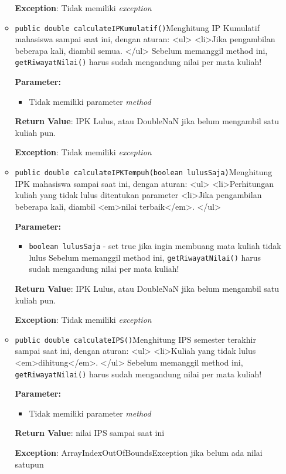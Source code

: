 \documentclass{article}
\begin{document}
\begin{enumerate}
\begin{itemize}
\textbf{Exception}: Tidak memiliki \textit{exception}

\item \texttt{public double calculateIPKumulatif()}Menghitung IP Kumulatif mahasiswa sampai saat ini, dengan aturan:
 <ul>
   <li>Jika pengambilan beberapa kali, diambil semua.
 </ul>
 Sebelum memanggil method ini, \texttt{getRiwayatNilai()} harus sudah mengandung nilai per mata kuliah!

\textbf{Parameter:}
\begin{itemize}
\item Tidak memiliki parameter \textit{method}
\end{itemize}
\textbf{Return Value}: IPK Lulus, atau  DoubleNaN jika belum mengambil satu kuliah pun.

\textbf{Exception}: Tidak memiliki \textit{exception}

\item \texttt{public double calculateIPKTempuh(boolean lulusSaja)}Menghitung IPK mahasiswa sampai saat ini, dengan aturan:
 <ul>
   <li>Perhitungan kuliah yang tidak lulus ditentukan parameter
   <li>Jika pengambilan beberapa kali, diambil <em>nilai terbaik</em>.
 </ul>

\textbf{Parameter:}
\begin{itemize}
\item \texttt{boolean lulusSaja} - 
set true jika ingin membuang mata kuliah tidak lulus 
 Sebelum memanggil method ini, \texttt{getRiwayatNilai()} harus sudah mengandung nilai per mata kuliah!
\end{itemize}
\textbf{Return Value}: IPK Lulus, atau  DoubleNaN jika belum mengambil satu kuliah pun.

\textbf{Exception}: Tidak memiliki \textit{exception}

\item \texttt{public double calculateIPS()}Menghitung IPS semester terakhir sampai saat ini, dengan aturan:
 <ul>
   <li>Kuliah yang tidak lulus <em>dihitung</em>.
 </ul>
 Sebelum memanggil method ini, \texttt{getRiwayatNilai()} harus sudah mengandung nilai per mata kuliah!

\textbf{Parameter:}
\begin{itemize}
\item Tidak memiliki parameter \textit{method}
\end{itemize}
\textbf{Return Value}: nilai IPS sampai saat ini

\textbf{Exception}: ArrayIndexOutOfBoundsException jika belum ada nilai satupun


\end{itemize}
\end{enumerate}
\end{document}

